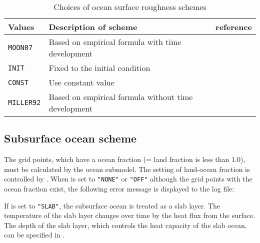 \begin{table}[h]
\begin{center}
  \caption{Choices of ocean surface roughness schemes}
  \label{tab:nml_ocean_rgn}
  \begin{tabularx}{150mm}{llX} \hline
    \rowcolor[gray]{0.9}  Values & Description of scheme & reference \\ \hline
      \verb|MOON07|   & Based on empirical formula with time development    & \citet{moon_2007} \\
      \verb|INIT|     & Fixed to the initial condition \\
      \verb|CONST|    & Use constant value \\
      \verb|MILLER92| & Based on empirical formula without time development & \citet{miller_1992} \\
    \hline
  \end{tabularx}
\end{center}
\end{table}


\clearpage
\subsection{Subsurface ocean scheme}

The grid points, which have a ocean fraction (= land fraction is less than 1.0), must be calculated by the ocean submodel. The setting of land-ocean fraction is controlled by .
When  is set to \verb|"NONE"| or \verb|"OFF"| although the grid points with the ocean fraction exist, the following error message is displayed to the log file:


If  is set to \verb|"SLAB"|, the subsurface ocean is treated as a slab layer. The temperature of the slab layer changes over time by the heat flux from the surface. The depth of the slab layer, which controls the heat capacity of the slab ocean, can be specified  in .


